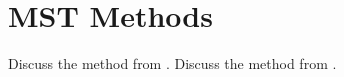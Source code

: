 \section{MST Methods}\label{sec:rw_mst_methods}
Discuss the method from \citet{felzenszwalb_2004_ijcv}.
Discuss the method from \citet{Straehle_k-smallestspanning}.